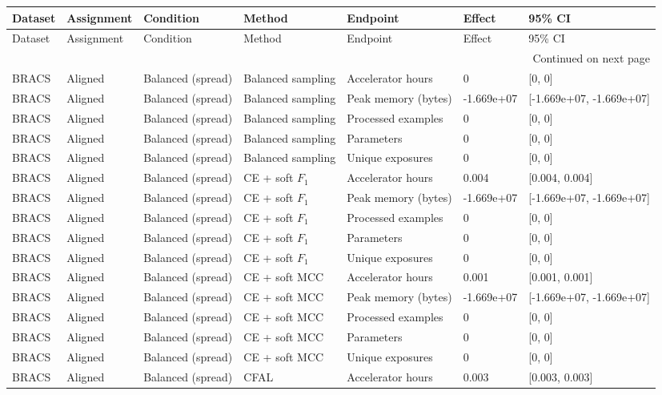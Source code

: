 \begin{longtable}{lllllll}
\toprule
Dataset & Assignment & Condition & Method & Endpoint & Effect & 95\% CI \\
\midrule
\endfirsthead
\toprule
Dataset & Assignment & Condition & Method & Endpoint & Effect & 95\% CI \\
\midrule
\endhead
\midrule
\multicolumn{7}{r}{Continued on next page} \\
\midrule
\endfoot
\bottomrule
\endlastfoot
BRACS & Aligned & Balanced (spread) & Balanced sampling & Accelerator hours & 0 & [0, 0] \\
BRACS & Aligned & Balanced (spread) & Balanced sampling & Peak memory (bytes) & -1.669e+07 & [-1.669e+07, -1.669e+07] \\
BRACS & Aligned & Balanced (spread) & Balanced sampling & Processed examples & 0 & [0, 0] \\
BRACS & Aligned & Balanced (spread) & Balanced sampling & Parameters & 0 & [0, 0] \\
BRACS & Aligned & Balanced (spread) & Balanced sampling & Unique exposures & 0 & [0, 0] \\
BRACS & Aligned & Balanced (spread) & CE + soft $F_1$ & Accelerator hours & 0.004 & [0.004, 0.004] \\
BRACS & Aligned & Balanced (spread) & CE + soft $F_1$ & Peak memory (bytes) & -1.669e+07 & [-1.669e+07, -1.669e+07] \\
BRACS & Aligned & Balanced (spread) & CE + soft $F_1$ & Processed examples & 0 & [0, 0] \\
BRACS & Aligned & Balanced (spread) & CE + soft $F_1$ & Parameters & 0 & [0, 0] \\
BRACS & Aligned & Balanced (spread) & CE + soft $F_1$ & Unique exposures & 0 & [0, 0] \\
BRACS & Aligned & Balanced (spread) & CE + soft MCC & Accelerator hours & 0.001 & [0.001, 0.001] \\
BRACS & Aligned & Balanced (spread) & CE + soft MCC & Peak memory (bytes) & -1.669e+07 & [-1.669e+07, -1.669e+07] \\
BRACS & Aligned & Balanced (spread) & CE + soft MCC & Processed examples & 0 & [0, 0] \\
BRACS & Aligned & Balanced (spread) & CE + soft MCC & Parameters & 0 & [0, 0] \\
BRACS & Aligned & Balanced (spread) & CE + soft MCC & Unique exposures & 0 & [0, 0] \\
BRACS & Aligned & Balanced (spread) & CFAL & Accelerator hours & 0.003 & [0.003, 0.003] \\

\end{longtable}

